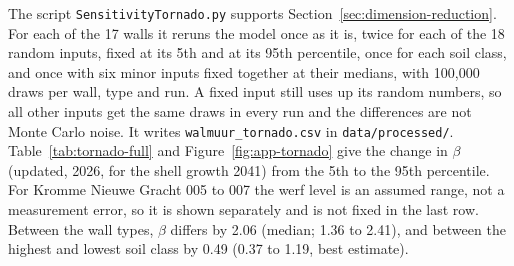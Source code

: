 The script \texttt{SensitivityTornado.py} supports Section~\ref{sec:dimension-reduction}.
For each of the 17 walls it reruns the model once as it is, twice for each of
the 18 random inputs, fixed at its 5th and at its 95th percentile, once for
each soil class, and once with six minor inputs fixed together at their
medians, with 100{,}000 draws per wall, type and run. A fixed input still uses
up its random numbers, so all other inputs get the same draws in every run and
the differences are not Monte Carlo noise. It writes
\texttt{walmuur\_tornado.csv} in \texttt{data/processed/}.
Table~\ref{tab:tornado-full} and Figure~\ref{fig:app-tornado} give the change in $\beta$ (updated, 2026, for
the shell growth 2041) from the 5th to the 95th percentile. For Kromme Nieuwe
Gracht 005 to 007 the werf level is an assumed range, not a measurement error,
so it is shown separately and is not fixed in the last row. Between the wall
types, $\beta$ differs by 2.06 (median; 1.36 to 2.41), and between the
highest and lowest soil class by 0.49 (0.37 to 1.19, best estimate).


